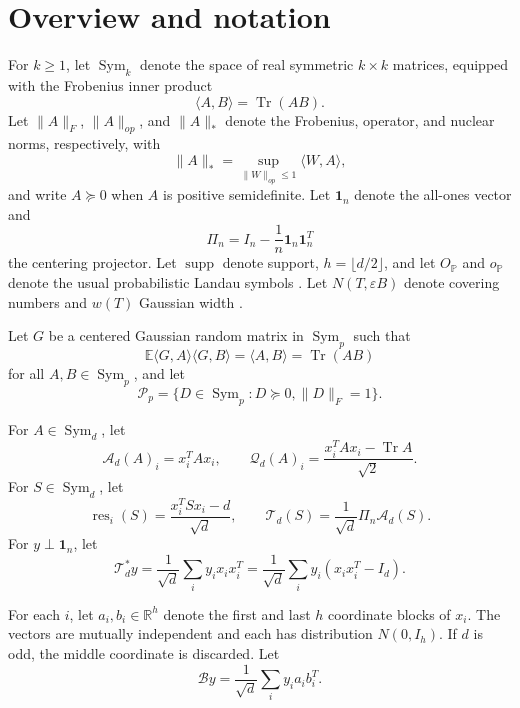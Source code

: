 \documentclass[11pt]{article}
\numberwithin{equation}{section}
\theoremstyle{definition}
\theoremstyle{remark}
\newcommand{\E}{\mathbb E}
\newcommand{\Pp}{\mathbb P}
\newcommand{\1}{\boldsymbol 1}
\newcommand{\cA}{\mathcal A}
\newcommand{\cB}{\mathcal B}
\newcommand{\cQ}{\mathcal Q}
\newcommand{\cT}{\mathcal T}
\newcommand{\PiZero}{\Pi_n}
\newcommand{\Sym}{\operatorname{Sym}}
\newcommand{\Tr}{\operatorname{Tr}}
\newcommand{\supp}{\operatorname{supp}}
\newcommand{\res}{\operatorname{res}}
\newcommand{\rentry}[1]{\res_{#1}}
\begin{document}
\section{Overview and notation}
\label{deterministic-framework}
\begin{humanblock}
    


For $k\ge1$, let $\Sym_k$ denote the space of real symmetric $k\times k$ matrices, equipped with the Frobenius inner product
\[
  \langle A,B\rangle=\Tr(AB).
\]
Let $\|A\|_F$, $\|A\|_{op}$, and $\|A\|_*$ denote the
Frobenius, operator, and nuclear norms, respectively, with
\[
  \|A\|_*=\sup_{\|W\|_{op}\le1}\langle W,A\rangle,
\]
and write $A\succeq0$ when $A$ is positive semidefinite.
Let $\1_n$ denote the all-ones vector and
\[
  \PiZero=I_n-\frac1n\1_n\1_n^T
\]
the centering projector. Let $\supp$ denote support, $h=\lfloor d/2\rfloor$, and let $O_{\Pp}$ and $o_{\Pp}$  denote the usual probabilistic Landau symbols \cite{vaart}. Let $N(T,\varepsilon B)$ denote covering numbers and $w(T)$ Gaussian width \cite{Vershynin2018}.

Let $G$ be a centered Gaussian random matrix in $\Sym_p$ such that
\[
  \E\langle G,A\rangle\langle G,B\rangle
  =\langle A,B\rangle
  =\Tr(AB)
\]
for all $A,B\in\Sym_p$, and let
\[
  \mathcal P_p=\{D\in\Sym_p:D\succeq0,\|D\|_F=1\}.
\]




For $A\in\Sym_d$, let
\[
  \cA_d(A)_i=x_i^TAx_i,\qquad
  \cQ_d(A)_i=\frac{x_i^TAx_i-\Tr A}{\sqrt2}.
\]
For $S\in\Sym_d$, let
\[
  \rentry{i}(S)=\frac{x_i^TSx_i-d}{\sqrt d},\qquad
  \cT_d(S)=\frac1{\sqrt d}\PiZero\cA_d(S).
\]
For $y\perp\1_n$, let
\[
  \cT_d^*y=\frac1{\sqrt d}\sum_iy_ix_ix_i^T
  =\frac1{\sqrt d}\sum_iy_i(x_ix_i^T-I_d).
\]


For each $i$, let $a_i,b_i\in\mathbb R^h$ denote the first and last $h$ coordinate blocks of $x_i$. The vectors are mutually independent and each has distribution $N(0,I_h)$. If $d$ is odd, the middle coordinate is discarded. Let
\[
  \cB y=\frac1{\sqrt d}\sum_iy_ia_ib_i^T.
\]


\end{humanblock}
\end{document}
